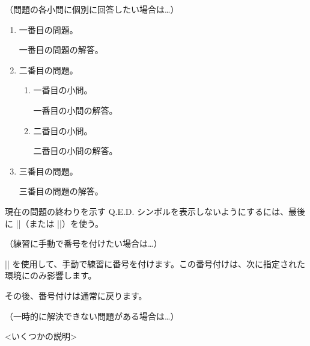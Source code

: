 \documentclass[11pt,
  logo = {example-image},
  title in boldface,
  theorem in new line,
  colored solution,
]{homework}
\begin{document}
\bigskip\textcolor{gray!55}{（問題の各小問に個別に回答したい場合は…）}

\begin{problem}[多くの小問がある問題]
    \begin{enumerate}
        \item 一番目の問題。

        \begin{solution}
            一番目の問題の解答。
        \end{solution}

        \item 二番目の問題。

        \begin{enumerate}
            \item 一番目の小問。

            \begin{solution}
                一番目の小問の解答。
            \end{solution}

            \item 二番目の小問。

            \begin{solution}
                二番目の小問の解答。
            \end{solution}

        \end{enumerate}

        \item 三番目の問題。

        \begin{solution}
            三番目の問題の解答。
        \end{solution}

    \end{enumerate}
    現在の問題の終わりを示す Q.E.D. シンボルを表示しないようにするには、最後に \cverb|\noqed|（または \cverb|\noQED|）を使う。
    \noQED
\end{problem}


\bigskip\textcolor{gray!55}{（練習に手動で番号を付けたい場合は…）}

\begin{exercise}[手動で番号を付けた練習]
    \cverb|\ManualNumbering| を使用して、手動で練習に番号を付けます。この番号付けは、次に指定された環境にのみ影響します。
\end{exercise}

\begin{exercise}
    その後、番号付けは通常に戻ります。
\end{exercise}


\bigskip\textcolor{gray!55}{（一時的に解決できない問題がある場合は…）}

\DNF<いくつかの説明>
\end{document}
